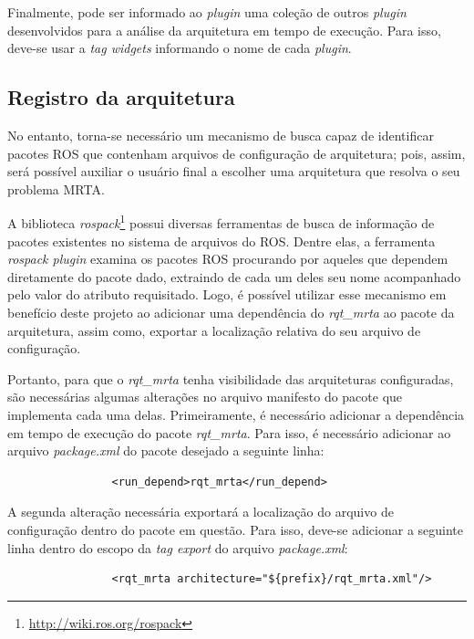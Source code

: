             Finalmente, pode ser informado ao \textit{plugin} uma coleção de outros \textit{plugin} desenvolvidos para a análise da arquitetura em tempo de execução. Para isso, deve-se usar a \textit{tag widgets} informando o nome de cada \textit{plugin}.
        
        \subsection{Registro da arquitetura} \label{subsec:arch_config_rgst}
            No entanto, torna-se necessário um mecanismo de busca capaz de identificar pacotes ROS que contenham arquivos de configuração de arquitetura; pois, assim, será possível auxiliar o usuário final a escolher uma arquitetura que resolva o seu problema MRTA.
            
            A biblioteca \textit{rospack}\footnote{\url{http://wiki.ros.org/rospack}} possui diversas ferramentas de busca de informação de pacotes existentes no sistema de arquivos do ROS. Dentre elas, a ferramenta \textit{rospack plugin} examina os pacotes ROS procurando por aqueles que dependem diretamente do pacote dado, extraindo de cada um deles seu nome acompanhado pelo valor do atributo requisitado. Logo, é possível utilizar esse mecanismo em benefício deste projeto ao adicionar uma dependência do \textit{rqt\_mrta} ao pacote da arquitetura, assim como, exportar a localização relativa do seu arquivo de configuração. 
            
            Portanto, para que o \textit{rqt\_mrta} tenha visibilidade das arquiteturas configuradas, são necessárias algumas alterações no arquivo manifesto do pacote que implementa cada uma delas. Primeiramente, é necessário adicionar a dependência em tempo de execução do pacote \textit{rqt\_mrta}. Para isso, é necessário adicionar ao arquivo \textit{package.xml} do pacote desejado a seguinte linha:
            
            \begin{lstlisting}
                <run_depend>rqt_mrta</run_depend>
            \end{lstlisting}
            
            A segunda alteração necessária exportará a localização do arquivo de configuração dentro do pacote em questão. Para isso, deve-se adicionar a seguinte linha dentro do escopo da \textit{tag export} do arquivo \textit{package.xml}:
            
            \begin{lstlisting}
                <rqt_mrta architecture="${prefix}/rqt_mrta.xml"/>
            \end{lstlisting}
            
